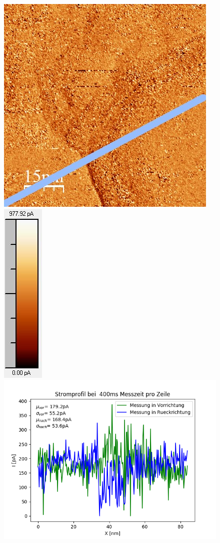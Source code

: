 \documentclass[12pt,a4paper]{article}
\begin{document}
\begin{figure}[H]
\includegraphics[scale=0.6]{Bilder/Anhang/Zeit/Strom/0_4_Zeit_nach_Strom.jpg}
\includegraphics[scale=0.6]{Bilder/Anhang/Zeit/Strom/0_4_Zeit_nach_Strom_Skala.jpg}
\includegraphics[scale=0.5]{Bilder/Anhang/Zeit/Strom/Strom_Profil_Zeit_0400.png}

\end{figure}
\end{document}
